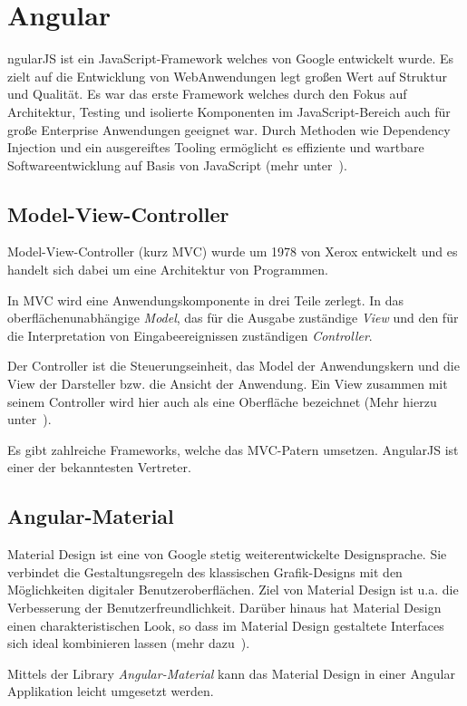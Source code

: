 \section{Angular}
ngularJS ist ein JavaScript-Framework welches von Google entwickelt wurde. Es zielt auf die Entwicklung von
WebAnwendungen legt großen Wert auf Struktur und Qualität. Es war das erste Framework welches durch den Fokus auf
Architektur, Testing und isolierte Komponenten im JavaScript-Bereich auch für große Enterprise Anwendungen geeignet war.
Durch Methoden wie Dependency Injection und ein ausgereiftes Tooling ermöglicht es effiziente und wartbare
Softwareentwicklung auf Basis von JavaScript (mehr unter~\cite{book_grundlagen_angular}).

\subsection{Model-View-Controller}
Model-View-Controller (kurz MVC) wurde um 1978 von Xerox entwickelt und es handelt sich dabei um eine Architektur von
Programmen.

In MVC wird eine Anwendungskomponente in drei Teile zerlegt. In das oberflächenunabhängige \textit{Model}, das für die
Ausgabe zuständige \textit{View} und den für die Interpretation von Eingabeereignissen zuständigen \textit{Controller}.

Der Controller ist die Steuerungseinheit, das Model der Anwendungskern und die View der Darsteller bzw. die Ansicht der
Anwendung. Ein View zusammen mit seinem Controller wird hier auch als eine Oberfläche bezeichnet (Mehr hierzu
unter~\cite{book_grundlagen_mvc}).

Es gibt zahlreiche Frameworks, welche das MVC-Patern umsetzen. AngularJS ist einer der bekanntesten Vertreter.

\subsection{Angular-Material}
Material Design ist eine von Google stetig weiterentwickelte Designsprache. Sie verbindet die Gestaltungsregeln des
klassischen Grafik-Designs mit den Möglichkeiten digitaler Benutzeroberflächen. Ziel von Material Design ist u.a. die
Verbesserung der Benutzerfreundlichkeit. Darüber hinaus hat Material Design einen charakteristischen Look, so dass im
Material Design gestaltete Interfaces sich ideal kombinieren lassen (mehr dazu~\cite{online_grundlagen_materialdesign}).

Mittels der Library \textit{Angular-Material} kann das Material Design in einer Angular Applikation leicht umgesetzt
werden.

